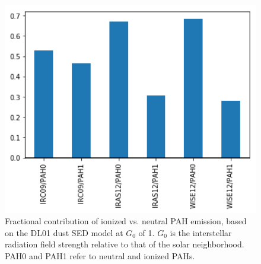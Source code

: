 \documentclass[preprint2,longabstract]{aastex}
\begin{document}
     \begin{figure}
     \label{fig:inband_ionfrac_bar}
     \centering
     \includegraphics[width=150mm]{../Plots/InBandContribution_PAH_bar.png}
     \caption{Fractional contribution of ionized vs. neutral PAH emission, based on the DL01 dust SED model at $G_{0}$ of 1. $G_{0}$ is the interstellar radiation field strength relative to that of the solar neighborhood. PAH0 and PAH1 refer to neutral and ionized PAHs. }
     \end{figure}
\end{document}
